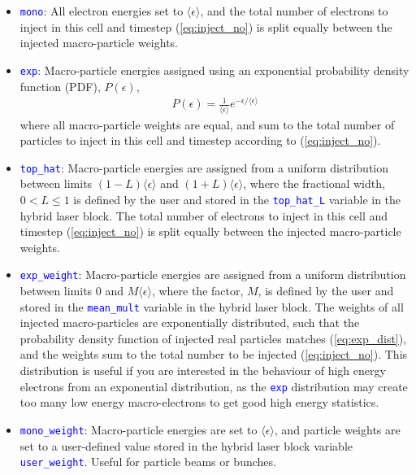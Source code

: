 \documentclass[12pt]{article}
\numberwithin{equation}{section}
\begin{document}
\begin{itemize}
  \item \textcolor{blue}{\texttt{mono}}: All electron energies set to $\langle\epsilon\rangle$, and the total number of electrons to inject in this cell and timestep (\ref{eq:inject_no}) is split equally between the injected macro-particle weights.
%
  \item \textcolor{blue}{\texttt{exp}}: Macro-particle energies assigned using an exponential probability density function (PDF), $P(\epsilon)$, 
  \begin{align} \label{eq:exp_dist}
    P(\epsilon) = \frac{1}{\langle\epsilon\rangle} e^{-\epsilon/{\langle\epsilon\rangle}}
  \end{align}
where all macro-particle weights are equal, and sum to the total number of particles to inject in this cell and timestep according to (\ref{eq:inject_no}).
% 
  \item \textcolor{blue}{\texttt{top\_hat}}: Macro-particle energies are assigned from a uniform distribution between limits $(1-L)\langle\epsilon\rangle$ and $(1+L)\langle\epsilon\rangle$, where the fractional width, $0<L\leq 1$ is defined by the user and stored in the \textcolor{blue}{\texttt{top\_hat\_L}} variable in the hybrid laser block. The total number of electrons to inject in this cell and timestep (\ref{eq:inject_no}) is split equally between the injected macro-particle weights.
% 
  \item \textcolor{blue}{\texttt{exp\_weight}}: Macro-particle energies are assigned from a uniform distribution between limits 0 and $M\langle\epsilon\rangle$, where the factor, $M$, is defined by the user and stored in the \textcolor{blue}{\texttt{mean\_mult}} variable in the hybrid laser block. The weights of all injected macro-particles are exponentially distributed, such that the probability density function of injected real particles matches (\ref{eq:exp_dist}), and the weights sum to the total number to be injected (\ref{eq:inject_no}). This distribution is useful if you are interested in the behaviour of high energy electrons from an exponential distribution, as the \textcolor{blue}{\texttt{exp}} distribution may create too many low energy macro-electrons to get good high energy statistics.
%
  \item \textcolor{blue}{\texttt{mono\_weight}}: Macro-particle energies are set to $\langle\epsilon\rangle$, and particle weights are set to a user-defined value stored in the hybrid laser block variable \textcolor{blue}{\texttt{user\_weight}}. Useful for particle beams or bunches.

\end{itemize}
\end{document}
